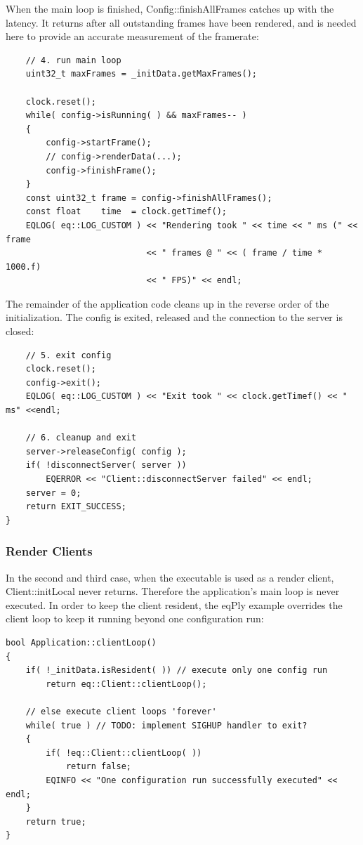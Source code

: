 \documentclass[10pt,a4]{scrartcl}
\begin{document}
When the main loop is finished, \textsf{Config::finishAllFrames} catches
up with the latency. It returns after all outstanding frames have been
rendered, and is needed here to provide an accurate measurement of the
framerate:

{\footnotesize\begin{lstlisting}
    // 4. run main loop
    uint32_t maxFrames = _initData.getMaxFrames();
    
    clock.reset();
    while( config->isRunning( ) && maxFrames-- )
    {
        config->startFrame();
        // config->renderData(...);
        config->finishFrame();
    }
    const uint32_t frame = config->finishAllFrames();
    const float    time  = clock.getTimef();
    EQLOG( eq::LOG_CUSTOM ) << "Rendering took " << time << " ms (" << frame
                            << " frames @ " << ( frame / time * 1000.f)
                            << " FPS)" << endl;
\end{lstlisting}}%

The remainder of the application code cleans up in the reverse order of
the initialization. The config is exited, released and the connection to
the server is closed:

{\footnotesize\begin{lstlisting}
    // 5. exit config
    clock.reset();
    config->exit();
    EQLOG( eq::LOG_CUSTOM ) << "Exit took " << clock.getTimef() << " ms" <<endl;

    // 6. cleanup and exit
    server->releaseConfig( config );
    if( !disconnectServer( server ))
        EQERROR << "Client::disconnectServer failed" << endl;
    server = 0;
    return EXIT_SUCCESS;
}
\end{lstlisting}}%

\subsubsection{Render Clients}

In the second and third case, when the executable is used as a render
client, \textsf{Client::initLocal} never returns. Therefore the
application's main loop is never executed. In order to keep the client
resident, the \textsf{eqPly} example overrides the client loop to keep
it running beyond one configuration run:

{\footnotesize\begin{lstlisting}
bool Application::clientLoop()
{
    if( !_initData.isResident( )) // execute only one config run
        return eq::Client::clientLoop();

    // else execute client loops 'forever'
    while( true ) // TODO: implement SIGHUP handler to exit?
    {
        if( !eq::Client::clientLoop( ))
            return false;
        EQINFO << "One configuration run successfully executed" << endl;
    }
    return true;
}
\end{lstlisting}}%
\end{document}
